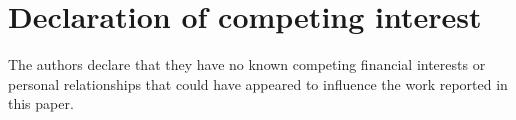 \documentclass[preprint,review,12pt,authoryear]{elsarticle}
\begin{document}
\section*{Declaration of competing interest}
The authors declare that they have no known competing financial interests or personal relationships that could have appeared
to influence the work reported in this paper.




 






\end{document}
